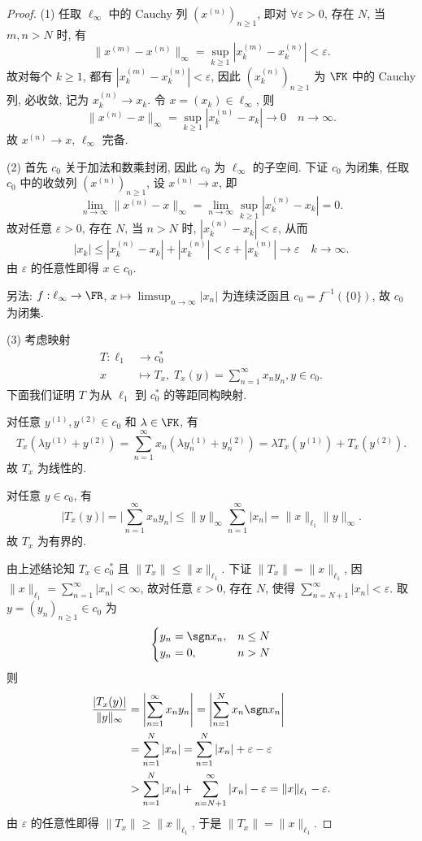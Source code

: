 \documentclass{mathexercise}
\begin{document}
\begin{proof}
    (1) 任取 $\ell_{\infty}$ 中的 Cauchy 列 $(x^{(n)})_{n\geq 1}$,
    即对 $\forall\varepsilon>0$, 存在 $N$, 当 $m,n>N$ 时, 有
    \[\|x^{(m)}-x^{(n)}\|_{\infty}=\sup_{k\geq 1}|x^{(m)}_k-x^{(n)}_k|<\varepsilon.\]
    故对每个 $k\geq 1$, 都有 $|x^{(m)}_k-x^{(n)}_k|<\varepsilon$,
    因此 $(x^{(n)}_k)_{n\geq 1}$ 为 $\FK$ 中的 Cauchy 列, 必收敛, 记为 $x^{(n)}_k\to x_k$.
    令 $x=(x_k)\in\ell_{\infty}$, 则
    \[\|x^{(n)}-x\|_{\infty}=\sup_{k\geq 1}|x^{(n)}_k-x_k|\to 0\quad n\to\infty.\]
    故 $x^{(n)}\to x$, $\ell_{\infty}$ 完备.

    (2) 首先 $c_0$ 关于加法和数乘封闭, 因此 $c_0$ 为 $\ell_{\infty}$
    的子空间. 下证 $c_0$ 为闭集, 任取 $c_0$ 中的收敛列 $(x^{(n)})_{n\geq 1}$,
    设 $x^{(n)}\to x$, 即
    \[\lim_{n\to\infty}\|x^{(n)}-x\|_{\infty}=\lim_{n\to\infty}\sup_{k\geq 1}|x^{(n)}_k-x_k|=0.\]
    故对任意 $\varepsilon>0$, 存在 $N$, 当 $n>N$ 时, $|x^{(n)}_k-x_k|<\varepsilon$, 从而
    \[|x_k|\leq|x^{(n)}_k-x_k|+|x^{(n)}_k|<\varepsilon+|x^{(n)}_k|\to\varepsilon\quad k\to\infty.\]
    由 $\varepsilon$ 的任意性即得 $x\in c_0$.

    另法: $f:\ell_{\infty}\to\FR$, $x\mapsto\limsup_{n\to\infty}|x_n|$
    为连续泛函且 $c_0=f^{-1}(\{0\})$, 故 $c_0$ 为闭集.

    (3) 考虑映射
    \begin{align*}
        T: \ell_1 & \longrightarrow c_0^* \\
                x & \longmapsto T_x,\;T_x(y)=\sum_{n=1}^{\infty}x_ny_n, y\in c_0.
    \end{align*}
    下面我们证明 $T$ 为从 $\ell_1$ 到 $c_0^*$ 的等距同构映射.

    对任意 $y^{(1)},y^{(2)}\in c_0$ 和 $\lambda\in\FK$, 有
    \[T_x(\lambda y^{(1)}+y^{(2)})=\sum_{n=1}^{\infty}x_n(\lambda y^{(1)}_n+y^{(2)}_n)=\lambda T_x(y^{(1)})+T_x(y^{(2)}).\]
    故 $T_x$ 为线性的.

    对任意 $y\in c_0$, 有
    \[|T_x(y)|=\biggl|\sum_{n=1}^{\infty} x_ny_n\biggr|\leq\|y\|_{\infty}\sum_{n=1}^{\infty}|x_n|=\|x\|_{\ell_1}\|y\|_{\infty}.\]
    故 $T_x$ 为有界的.

    由上述结论知 $T_x\in c_0^*$ 且 $\|T_x\|\leq\|x\|_{\ell_1}$. 下证 $\|T_x\|=\|x\|_{\ell_1}$,
    因 $\|x\|_{\ell_1}=\sum_{n=1}^{\infty}|x_n|<\infty$, 故对任意 $\varepsilon>0$, 存在 $N$,
    使得 $\sum_{n=N+1}^{\infty}|x_n|<\varepsilon$. 取 $y=(y_n)_{n\geq 1}\in c_0$ 为
    \[\begin{cases}
        y_n=\sgn x_n, & n\leq N \\
        y_n=0, & n>N
    \end{cases}\]
    则
    \begin{align*}
        \frac{|T_x(y)|}{\|y\|_{\infty}}
        & =\left|\sum_{n=1}^{\infty}x_ny_n\right|=\left|\sum_{n=1}^N x_n\sgn x_n\right| \\
        & =\sum_{n=1}^N |x_n|=\sum_{n=1}^N |x_n|+\varepsilon-\varepsilon \\
        & >\sum_{n=1}^N |x_n|+\sum_{n=N+1}^{\infty} |x_n|-\varepsilon=\|x\|_{\ell_1}-\varepsilon. 
    \end{align*}
    由 $\varepsilon$ 的任意性即得 $\|T_x\|\geq \|x\|_{\ell_1}$, 于是 $\|T_x\|=\|x\|_{\ell_1}$.


\end{proof}
\end{document}
